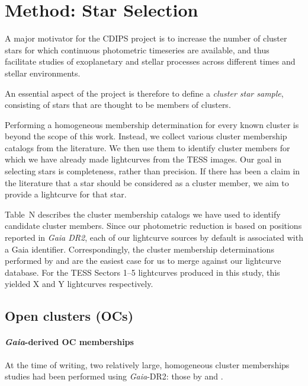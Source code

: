 \documentclass[12pt,twocolumn,tighten]{aastex62}
\begin{document}
\section{Method: Star Selection}
\label{sec:starselection}

A major motivator for the CDIPS project is to increase the number of
cluster stars for which continuous photometric timeseries are
available, and thus facilitate studies of exoplanetary and stellar
processes across different times and stellar environments.

An essential aspect of the project is therefore to define a {\it
cluster star sample}, consisting of stars that are thought to be
members of clusters.

Performing a homogeneous membership determination for every known
cluster is beyond the scope of this work.  Instead, we collect various
cluster membership catalogs from the literature.  We then use them to
identify cluster members for which we have already made lightcurves
from the TESS images.  Our goal in selecting stars is completeness,
rather than precision.  If there has been a claim in the literature
that a star should be considered as a cluster member, we aim to
provide a lightcurve for that star.

Table~N describes the cluster membership catalogs we have used to
identify candidate cluster members.  Since our photometric reduction
is based on positions reported in {\it Gaia DR2}, each of our
lightcurve sources by default is associated with a Gaia identifier.
Correspondingly, the cluster membership determinations performed by
\citet{cantat-gaudin_gaia_2018} and \citet{gaia_hr_2018} are the
easiest case for us to merge against our lightcurve database.
For the TESS Sectors 1--5 lightcurves produced in this study, this
yielded X and Y lightcurves respectively.




\subsection{Open clusters (OCs)}
\label{subsec:oc}

\paragraph{{\it Gaia}-derived OC memberships}
At the time of writing, two relatively large, homogeneous cluster
memberships studies had been performed using {\it Gaia}-DR2: those by
\citet{cantat-gaudin_gaia_2018} and \citet{gaia_hr_2018}.
\end{document}
